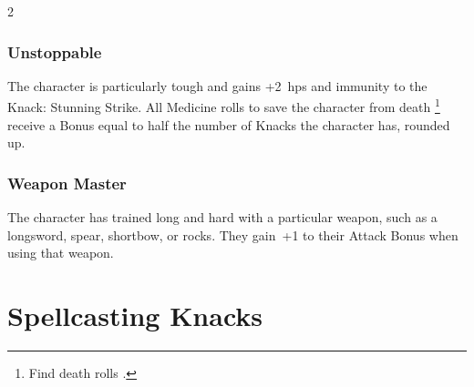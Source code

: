 \begin{multicols}{2}
\subsubsection{Unstoppable}

The character is particularly tough and gains +2~\glspl{hp} and immunity to the Knack: Stunning Strike.
All Medicine rolls to save the character from death%
\footnote{Find death rolls .}
receive a Bonus equal to half the number of Knacks the character has, rounded up.

\subsubsection{Weapon Master}

The character has trained long and hard with a particular weapon, such as a longsword, spear, shortbow, or rocks.
They gain~+1 to their Attack Bonus when using that weapon.

\end{multicols}

\section{Spellcasting Knacks}

